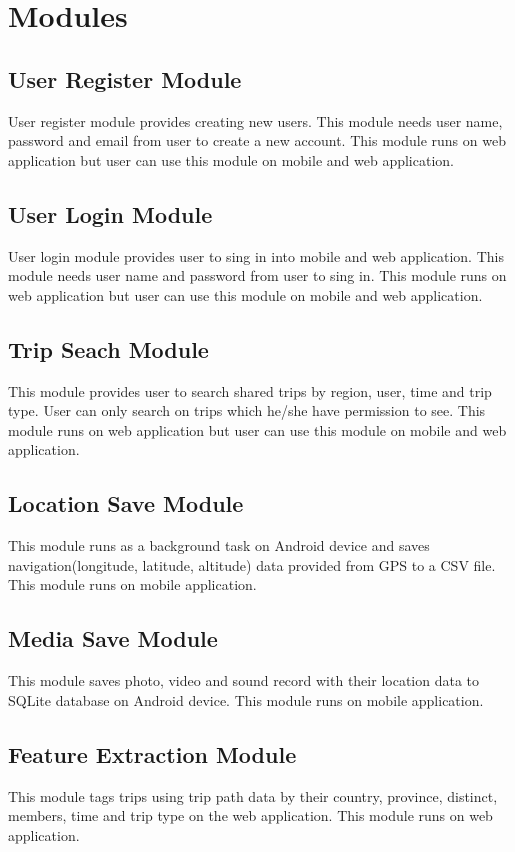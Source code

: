\section{Modules}

\subsection{User Register Module}
User register module provides creating new users. This module needs user name, password and email from user to create a new account. This module runs on web application but user can use this module on mobile and web application.
\subsection{User Login Module}
User login module provides user to sing in into mobile and web application. This module needs user name and password from user to sing in. This module runs on web application but user can use this module on mobile and web application.
\subsection{Trip Seach Module}
This module provides user to search shared trips by region, user, time and trip type. User can only search on trips which he/she have permission to see. This module runs on web application but user can use this module on mobile and web application. 
\subsection{Location Save Module}
This module runs as a background task on Android device and saves navigation(longitude, latitude, altitude) data provided from GPS to a CSV file. This module runs on mobile application.
\subsection{Media Save Module}
This module saves photo, video and sound record with their location data to SQLite database on Android device. This module runs on mobile application.
\subsection{Feature Extraction Module}
This module tags trips using trip path data by their country, province, distinct, members, time and trip type on the web application. This module runs on web application.
